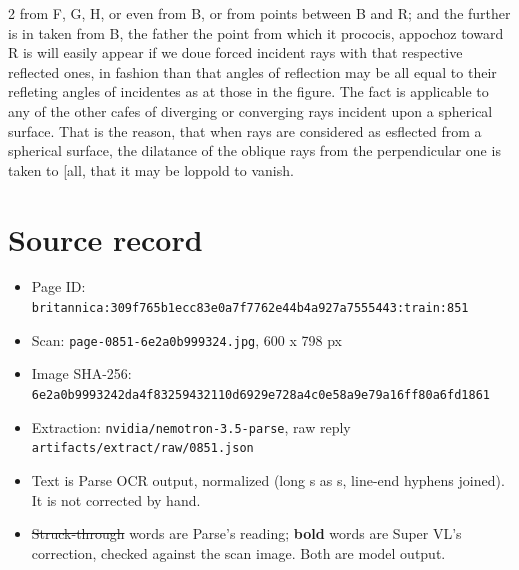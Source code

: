\documentclass[10pt]{article}
\begin{document}
\begin{multicols}{2}
from F, G, H, or even from B, or from points between B and R; and the further is in taken from B, the father the point from which it prococis, appochoz toward R is will easily appear if we doue forced incident rays with that respective reflected ones, in fashion than that angles of reflection may be all equal to their refleting angles of incidentes as at those in the figure. The fact is applicable to any of the other cafes of diverging or converging rays incident upon a spherical surface. That is the reason, that when rays are considered as esflected from a spherical surface, the dilatance of the oblique rays from the perpendicular one is taken to [all, that it may be loppold to vanish.
\end{multicols}
\section*{Source record}
\begin{itemize}
\item Page ID: \texttt{britannica:309f765b1ecc83e0a7f7762e44b4a927a7555443:train:851}
\item Scan: \texttt{page-0851-6e2a0b999324.jpg}, 600 x 798 px
\item Image SHA-256: \texttt{\small 6e2a0b9993242da4f83259432110d6929e728a4c0e58a9e79a16ff80a6fd1861}
\item Extraction: \texttt{nvidia/nemotron-3.5-parse}, raw reply \texttt{artifacts/extract/raw/0851.json}
\item Text is Parse OCR output, normalized (long s as s, line-end hyphens joined). It is not corrected by hand.
\item \sout{Struck-through} words are Parse's reading; \textbf{bold} words are Super VL's correction, checked against the scan image. Both are model output.
\end{itemize}
\end{document}
